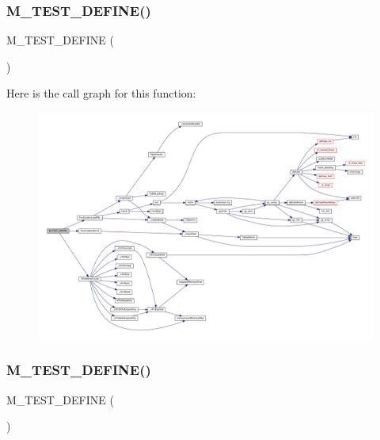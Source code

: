 \subsubsection{\texorpdfstring{M\+\_\+\+T\+E\+S\+T\+\_\+\+D\+E\+F\+I\+N\+E()}{M\_TEST\_DEFINE()}\hspace{0.1cm}{\footnotesize\ttfamily [1/11]}}
{\footnotesize\ttfamily M\+\_\+\+T\+E\+S\+T\+\_\+\+D\+E\+F\+I\+NE (\begin{DoxyParamCaption}\item[{empty\+Codec}]{ }\end{DoxyParamCaption})}

Here is the call graph for this function\+:
\nopagebreak
\begin{figure}[H]
\begin{center}
\leavevmode
\includegraphics[width=350pt]{test_2text-codec_8c_a50135e1d28f686504681d5bb103978ac_cgraph}
\end{center}
\end{figure}
\mbox{\label{test_2text-codec_8c_a680dac09ca0fbc2796d1f2bf578f04b8}} 
\subsubsection{\texorpdfstring{M\+\_\+\+T\+E\+S\+T\+\_\+\+D\+E\+F\+I\+N\+E()}{M\_TEST\_DEFINE()}\hspace{0.1cm}{\footnotesize\ttfamily [2/11]}}
{\footnotesize\ttfamily M\+\_\+\+T\+E\+S\+T\+\_\+\+D\+E\+F\+I\+NE (\begin{DoxyParamCaption}\item[{single\+Entry}]{ }\end{DoxyParamCaption})}


